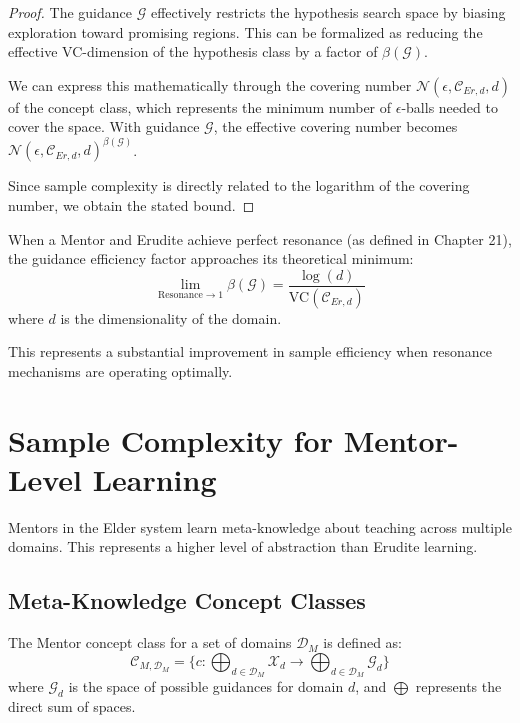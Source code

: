 \begin{proof}
The guidance $\mathcal{G}$ effectively restricts the hypothesis search space by biasing exploration toward promising regions. This can be formalized as reducing the effective VC-dimension of the hypothesis class by a factor of $\beta(\mathcal{G})$.

We can express this mathematically through the covering number $\mathcal{N}(\epsilon, \mathcal{C}_{Er,d}, d)$ of the concept class, which represents the minimum number of $\epsilon$-balls needed to cover the space. With guidance $\mathcal{G}$, the effective covering number becomes $\mathcal{N}(\epsilon, \mathcal{C}_{Er,d}, d)^{\beta(\mathcal{G})}$.

Since sample complexity is directly related to the logarithm of the covering number, we obtain the stated bound.
\end{proof}

\begin{corollary}
When a Mentor and Erudite achieve perfect resonance (as defined in Chapter 21), the guidance efficiency factor approaches its theoretical minimum:
\begin{equation}
\lim_{\text{Resonance} \rightarrow 1} \beta(\mathcal{G}) = \frac{\log(d)}{\text{VC}(\mathcal{C}_{Er,d})}
\end{equation}
where $d$ is the dimensionality of the domain.
\end{corollary}

This represents a substantial improvement in sample efficiency when resonance mechanisms are operating optimally.

\section{Sample Complexity for Mentor-Level Learning}

Mentors in the Elder system learn meta-knowledge about teaching across multiple domains. This represents a higher level of abstraction than Erudite learning.

\subsection{Meta-Knowledge Concept Classes}

\begin{definition}
The Mentor concept class for a set of domains $\mathcal{D}_M$ is defined as:
\begin{equation}
\mathcal{C}_{M,\mathcal{D}_M} = \{c: \bigoplus_{d \in \mathcal{D}_M} \mathcal{X}_d \rightarrow \bigoplus_{d \in \mathcal{D}_M} \mathcal{G}_d\}
\end{equation}
where $\mathcal{G}_d$ is the space of possible guidances for domain $d$, and $\bigoplus$ represents the direct sum of spaces.
\end{definition}

